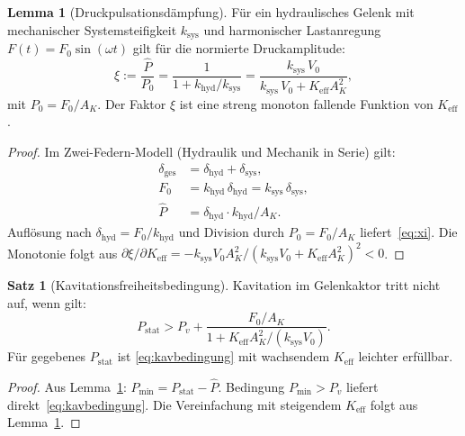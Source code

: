 ﻿\documentclass[a4paper,12pt]{scrreprt}
\theoremstyle{definition}
\newtheorem{satz}{Satz}[section]
\newtheorem{lemma}{Lemma}[section]
\begin{document}
\begin{lemma}[Druckpulsationsdämpfung]
\label{lem:druckpuls}
Für ein hydraulisches Gelenk mit mechanischer Systemsteifigkeit $k_{\text{sys}}$
und harmonischer Lastanregung $F(t) = F_0 \sin(\omega t)$ gilt für die
normierte Druckamplitude:
\begin{equation}
  \xi := \frac{\hat{P}}{P_0}
  = \frac{1}{1 + k_{\text{hyd}}/k_{\text{sys}}}
  = \frac{k_{\text{sys}} \, V_0}{k_{\text{sys}} \, V_0 + K_{\text{eff}} A_K^2},
  \label{eq:xi}
\end{equation}
mit $P_0 = F_0/A_K$. Der Faktor $\xi$ ist eine streng monoton fallende
Funktion von $K_{\text{eff}}$.
\end{lemma}

\begin{proof}
Im Zwei-Federn-Modell (Hydraulik und Mechanik in Serie) gilt:
\begin{align*}
  \delta_{\text{ges}} &= \delta_{\text{hyd}} + \delta_{\text{sys}},\\
  F_0 &= k_{\text{hyd}} \, \delta_{\text{hyd}} = k_{\text{sys}} \, \delta_{\text{sys}},\\
  \hat{P} &= \delta_{\text{hyd}} \cdot k_{\text{hyd}} / A_K.
\end{align*}
Auflösung nach $\delta_{\text{hyd}} = F_0/k_{\text{hyd}}$ und Division durch
$P_0 = F_0/A_K$ liefert~\eqref{eq:xi}. Die Monotonie folgt aus
$\partial \xi / \partial K_{\text{eff}} = -k_{\text{sys}} V_0 A_K^2 /
(k_{\text{sys}} V_0 + K_{\text{eff}} A_K^2)^2 < 0$.
\end{proof}

\begin{satz}[Kavitationsfreiheitsbedingung]
\label{satz:kavitation}
Kavitation im Gelenkaktor tritt nicht auf, wenn gilt:
\begin{equation}
  P_{\text{stat}} > P_v + \frac{F_0/A_K}{1 + K_{\text{eff}} A_K^2/(k_{\text{sys}} V_0)}.
  \label{eq:kavbedingung}
\end{equation}
Für gegebenes $P_{\text{stat}}$ ist \eqref{eq:kavbedingung} mit
wachsendem $K_{\text{eff}}$ leichter erfüllbar.
\end{satz}

\begin{proof}
Aus Lemma~\ref{lem:druckpuls}: $P_{\min} = P_{\text{stat}} - \hat{P}$.
Bedingung $P_{\min} > P_v$ liefert direkt~\eqref{eq:kavbedingung}.
Die Vereinfachung mit steigendem $K_{\text{eff}}$ folgt aus
Lemma~\ref{lem:druckpuls}.
\end{proof}
\end{document}

